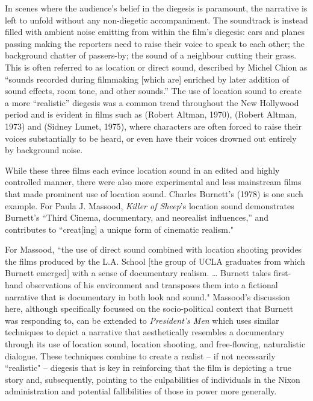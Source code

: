 In scenes where the audience’s belief in the diegesis is paramount, the narrative is left to unfold without any non-diegetic accompaniment.
The soundtrack is instead filled with ambient noise emitting from within the film’s diegesis: cars and planes passing making the reporters need to raise their voice to speak to each other; the background chatter of passers-by; the sound of a neighbour cutting their grass.
This is often referred to as location or direct sound, described by Michel Chion as ``sounds recorded during filmmaking [which are] enriched by later addition of sound effects, room tone, and other sounds.”\autocites[][96]{chion_audio-vision_1994}
The use of location sound to create a more ``realistic” diegesis was a common trend throughout the New Hollywood period and is evident in films such as  (Robert Altman, 1970),  (Robert Altman, 1973) and  (Sidney Lumet, 1975), where characters are often forced to raise their voices substantially to be heard, or even have their voices drowned out entirely by background noise.

While these three films each evince location sound in an edited and highly controlled manner, there were also more experimental and less mainstream films that made prominent use of location sound.
Charles Burnett’s  (1978) is one such example.
For Paula J. Massood, \textit{Killer of Sheep}’s location sound demonstrates Burnett’s “Third Cinema, documentary, and neorealist influences,” and contributes to “creat[ing] a unique form of cinematic realism."\autocites[][39]{massood_aesthetic_1999}

For Massood, ``the use of direct sound combined with location shooting provides the films produced by the L.A. School [the group of UCLA graduates from which Burnett emerged] with a sense of documentary realism. … Burnett takes first-hand observations of his environment and transposes them into a fictional narrative that is documentary in both look and sound."\autocites[][27]{massood_aesthetic_1999}
Massood’s discussion here, although specifically focussed on the socio-political context that Burnett was responding to, can be extended to \textit{President’s Men} which uses similar techniques to depict a narrative that aesthetically resembles a documentary through its use of location sound, location shooting, and free-flowing, naturalistic dialogue.
These techniques combine to create a realist – if not necessarily ``realistic" – diegesis that is key in reinforcing that the film is depicting a true story and, subsequently, pointing to the culpabilities of individuals in the Nixon administration and potential fallibilities of those in power more generally. 


